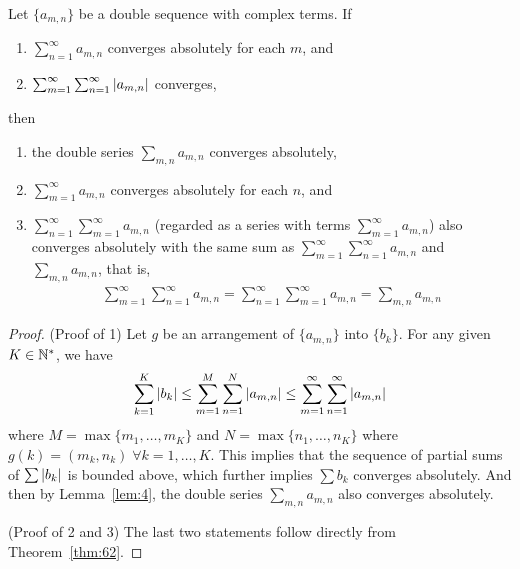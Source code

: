 \documentclass[thmcnt=section, 12pt]{my-elegantbook}
\begin{document}
\begin{theorem} \label{thm:61}
    Let $\{a_{m,n}\}$ be a double sequence with complex terms. If 
    \begin{enumerate}[label=\textcolor{structurecolor}{\alph*.}]
        \item $\sum_{n=1}^\infty a_{m,n}$ converges absolutely for each $m$, and 
        \item $\sum_{m=1}^\infty \sum_{n=1}^\infty \left\lvert a_{m,n} \right\rvert$ converges,
    \end{enumerate}
    then 
    \begin{enumerate}
        \item the double series $\sum_{m,n} a_{m,n}$ converges absolutely,
        \item $\sum_{m=1}^\infty a_{m,n}$ converges absolutely for each $n$, and 
        \item $\sum_{n=1}^\infty \sum_{m=1}^\infty a_{m,n}$ (regarded as a series with terms $\sum_{m=1}^\infty a_{m,n}$) also converges absolutely with the same sum as $\sum_{m=1}^\infty \sum_{n=1}^\infty a_{m,n}$ and $\sum_{m,n} a_{m,n}$, that is,
        \begin{align*}
            \sum_{m=1}^\infty \sum_{n=1}^\infty a_{m,n}
            = \sum_{n=1}^\infty \sum_{m=1}^\infty a_{m,n}
            = \sum_{m, n} a_{m,n}
        \end{align*}
    \end{enumerate}
\end{theorem}

\begin{proof}
    (Proof of 1) Let $g$ be an arrangement of $\{ a_{m,n} \}$ into $\{b_k\}$. For any given $K \in \mathbb{N}^\ast$, we have 
    \begin{align*}
        \sum_{k=1}^K \left\lvert b_k \right\rvert
        \leq \sum_{m=1}^M \sum_{n=1}^N \left\lvert a_{m,n} \right\rvert
        \leq \sum_{m=1}^\infty \sum_{n=1}^\infty \left\lvert a_{m,n} \right\rvert
    \end{align*}
    where $M = \max \{m_1, \ldots, m_K\}$ and $N = \max \{n_1, \ldots, n_K\}$ where $g(k) = (m_k, n_k) \; \forall k = 1, \ldots, K$. This implies that the sequence of partial sums of $\sum \left\lvert b_k \right\rvert$ is bounded above, which further implies $\sum b_k$ converges absolutely. And then by Lemma~\ref{lem:4}, the double series $\sum_{m,n} a_{m,n}$ also converges absolutely.

    (Proof of 2 and 3) The last two statements follow directly from Theorem~\ref{thm:62}. 
\end{proof}

\end{document}
